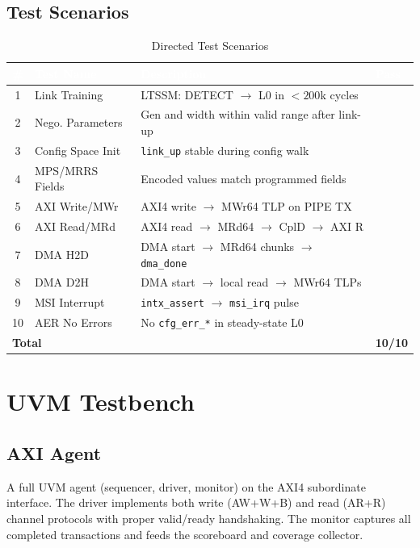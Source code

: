 \documentclass[12pt,a4paper]{report}
\newcommand{\theadcell}[1]{%
  \cellcolor{tablehead}\textcolor{white}{\textbf{#1}}}
\newcommand{\cmark}{\textcolor{scgreen}{\ding{51}}}
\begin{document}
\subsection{Test Scenarios}

\begin{table}[H]
\centering
\caption{Directed Test Scenarios}
\label{tab:tests}
\begin{tabular}{clp{8cm}l}
  \toprule
  \theadcell{\#} & \theadcell{Test Name} & \theadcell{Description} & \theadcell{Pass} \\
  \midrule
  1  & Link Training    & LTSSM: DETECT $\to$ L0 in $<200$k cycles & \cmark \\
  2  & Nego. Parameters & Gen and width within valid range after link-up & \cmark \\
  3  & Config Space Init& \texttt{link\_up} stable during config walk & \cmark \\
  4  & MPS/MRRS Fields  & Encoded values match programmed fields & \cmark \\
  5  & AXI Write/MWr    & AXI4 write $\to$ MWr64 TLP on PIPE TX & \cmark \\
  6  & AXI Read/MRd     & AXI4 read $\to$ MRd64 $\to$ CplD $\to$ AXI R & \cmark \\
  7  & DMA H2D          & DMA start $\to$ MRd64 chunks $\to$ \texttt{dma\_done} & \cmark \\
  8  & DMA D2H          & DMA start $\to$ local read $\to$ MWr64 TLPs & \cmark \\
  9  & MSI Interrupt    & \texttt{intx\_assert} $\to$ \texttt{msi\_irq} pulse & \cmark \\
  10 & AER No Errors    & No \texttt{cfg\_err\_*} in steady-state L0 & \cmark \\
  \midrule
  \multicolumn{3}{l}{\textbf{Total}} & \textbf{10/10} \\
  \bottomrule
\end{tabular}
\end{table}

\section{UVM Testbench}

\subsection{AXI Agent}

A full UVM agent (sequencer, driver, monitor) on the AXI4 subordinate interface.
The driver implements both write (AW+W+B) and read (AR+R) channel protocols
with proper valid/ready handshaking. The monitor captures all completed
transactions and feeds the scoreboard and coverage collector.
\end{document}
